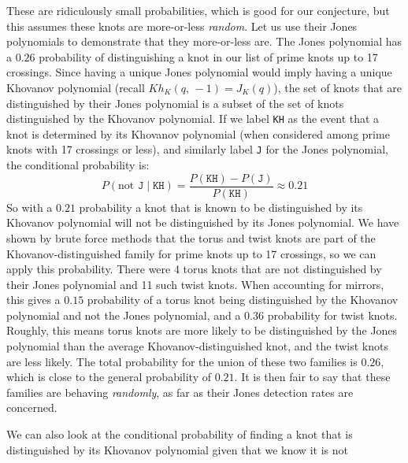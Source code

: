     \par\hfill\par
    These are ridiculously small probabilities, which is good for our
    conjecture,
    but this assumes these knots are more-or-less \textit{random}.
    Let us use their Jones polynomials to demonstrate that they more-or-less
    are. The Jones polynomial
    has a $0.26$ probability of distinguishing a knot in our list of prime knots
    up to 17 crossings. Since having a unique Jones polynomial would imply
    having a unique Khovanov polynomial (recall $Kh_{K}(q,\,-1)=J_{K}(q)$),
    the set of knots
    that are distinguished by their Jones polynomial is a subset of the set of
    knots distinguished by the Khovanov polynomial. If we label
    \texttt{KH} as the event that a knot is determined by its Khovanov
    polynomial (when considered among prime knots with 17 crossings or less),
    and similarly label \texttt{J} for the Jones polynomial, the conditional
    probability is:
    \begin{equation}
        P(\textrm{not }\texttt{J}\;|\;\texttt{KH})
        =\frac{P(\texttt{KH})-P(\texttt{J})}{P(\texttt{KH})}
        \approx{0.21}
    \end{equation}
    So with a $0.21$ probability a knot that is known to be distinguished by
    its Khovanov polynomial will not be distinguished by its Jones polynomial.
    We have shown by brute force methods that the torus and twist knots are
    part of the Khovanov-distinguished family for prime knots up to 17
    crossings, so we can apply this probability. There were 4 torus knots that
    are not distinguished by their Jones polynomial and 11 such twist knots.
    When accounting for mirrors, this gives a
    $0.15$ probability of a torus knot being distinguished by the Khovanov
    polynomial and not the Jones polynomial, and a $0.36$ probability for twist
    knots. Roughly, this means torus knots are more likely to be distinguished
    by the Jones polynomial than the average Khovanov-distinguished knot,
    and the twist knots are less likely. The total probability for the union
    of these two families is $0.26$, which is close to the general
    probability of $0.21$. It is then fair to say that these
    families are behaving \textit{randomly}, as far as their
    Jones detection rates are concerned.
    \par\hfill\par
    We can also look at the conditional probability of finding a knot that is
    distinguished by its Khovanov polynomial given that we know it is not
